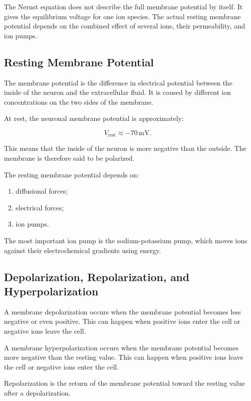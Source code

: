 \begin{authornote}
The Nernst equation does not describe the full membrane potential by itself. It gives the equilibrium voltage for one ion species. The actual resting membrane potential depends on the combined effect of several ions, their permeability, and ion pumps.
\end{authornote}

\subsection{Resting Membrane Potential}

The membrane potential is the difference in electrical potential between the inside of the neuron and the extracellular fluid. It is caused by different ion concentrations on the two sides of the membrane.

At rest, the neuronal membrane potential is approximately:

\[
V_{\text{rest}} \approx -70\,\text{mV}.
\]

This means that the inside of the neuron is more negative than the outside. The membrane is therefore said to be polarized.

The resting membrane potential depends on:

\begin{enumerate}[noitemsep]
    \item diffusional forces;
    \item electrical forces;
    \item ion pumps.
\end{enumerate}

The most important ion pump is the sodium-potassium pump, which moves ions against their electrochemical gradients using energy.

\subsection{Depolarization, Repolarization, and Hyperpolarization}

A membrane depolarization occurs when the membrane potential becomes less negative or even positive. This can happen when positive ions enter the cell or negative ions leave the cell.

A membrane hyperpolarization occurs when the membrane potential becomes more negative than the resting value. This can happen when positive ions leave the cell or negative ions enter the cell.

Repolarization is the return of the membrane potential toward the resting value after a depolarization.

